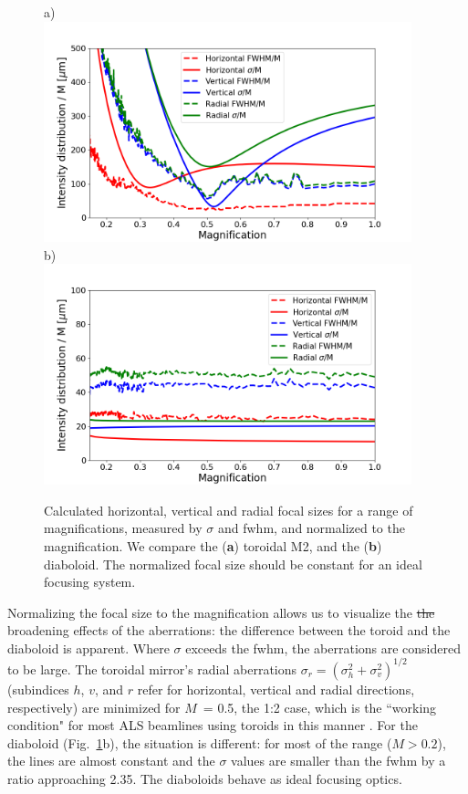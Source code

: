\documentclass[preprint]{iucr}       %
\newcommand{\inred}[1]{{\color{red}#1}}
\begin{document}
\begin{figure}\label{fig:scan}
\flushleft
a)\\
\centering
\includegraphics[width=0.95\textwidth,trim=1cm 0.1cm 1cm 0.5cm,clip=true]{figures/scan_toroid.png}\\
\flushleft
b)\\
\centering
\includegraphics[width=0.95\textwidth,trim=1cm 0.1cm 1cm 0.5cm,clip=true]{figures/scan_diaboloid.png}\\
\caption{Calculated horizontal, vertical and radial focal sizes for a range of magnifications, measured by $\sigma$ and fwhm, and normalized to the magnification. We compare the (\textbf{a}) toroidal M2, and the (\textbf{b}) diaboloid. The normalized focal size should be constant for an ideal focusing system.}
\end{figure}

Normalizing the focal size to the magnification allows us to visualize the \inred{\sout{the}} broadening effects of the aberrations: the difference between the toroid and the diaboloid is apparent. Where $\sigma$ exceeds the fwhm, the aberrations are considered to be large. The toroidal mirror's radial aberrations $\sigma_r = (\sigma_h^2 + \sigma_v^2)^{1/2}$ (subindices $h$, $v$, and $r$ refer for horizontal, vertical and radial directions, respectively) are minimized for $M$~= 0.5, the 1:2 case, which is the ``working condition" for most ALS beamlines using toroids in this manner \cite{MacDowell2004}. For the diaboloid (Fig.~\ref{fig:scan}b), the situation is different: for most of the range ($M > 0.2$), the lines are almost constant and the $\sigma$ values are smaller than the fwhm by a ratio approaching 2.35. The diaboloids behave as ideal focusing optics.
\end{document}
